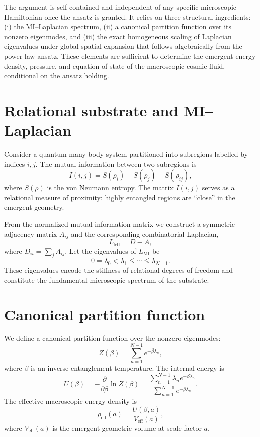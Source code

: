 \documentclass[aps,prd,onecolumn,nofootinbib,preprint]{revtex4-2}
\begin{document}
The argument is self-contained and independent of any specific microscopic Hamiltonian once the
ansatz is granted. It relies on three structural ingredients: (i) the MI--Laplacian spectrum, (ii) a
canonical partition function over its nonzero eigenmodes, and (iii) the exact homogeneous scaling
of Laplacian eigenvalues under global spatial expansion that follows algebraically from the
power-law ansatz. These elements are sufficient to determine the emergent energy density, pressure,
and equation of state of the macroscopic cosmic fluid, conditional on the ansatz holding.

\section{Relational substrate and MI--Laplacian}

Consider a quantum many-body system partitioned into subregions labelled by indices $i,j$. The
mutual information between two subregions is
\begin{equation}
I(i,j) = S(\rho_i) + S(\rho_j) - S(\rho_{ij}),
\end{equation}
where $S(\rho)$ is the von Neumann entropy. The matrix $I(i,j)$ serves as a relational measure of
proximity: highly entangled regions are ``close'' in the emergent geometry.

From the normalized mutual-information matrix we construct a symmetric adjacency matrix
$A_{ij}$ and the corresponding combinatorial Laplacian,
\begin{equation}
L_{\mathrm{MI}} = D - A,
\end{equation}
where $D_{ii} = \sum_j A_{ij}$. Let the eigenvalues of $L_{\mathrm{MI}}$ be
\begin{equation}
0 = \lambda_0 < \lambda_1 \le \cdots \le \lambda_{N-1}.
\end{equation}
These eigenvalues encode the stiffness of relational degrees of freedom and constitute the
fundamental microscopic spectrum of the substrate.

\section{Canonical partition function}

We define a canonical partition function over the nonzero eigenmodes:
\begin{equation}
Z(\beta) = \sum_{n=1}^{N-1} e^{-\beta \lambda_n},
\end{equation}
where $\beta$ is an inverse entanglement temperature. The internal energy is
\begin{equation}
U(\beta)
= -\frac{\partial}{\partial \beta} \ln Z(\beta)
= \frac{\sum_{n=1}^{N-1} \lambda_n e^{-\beta \lambda_n}}
       {\sum_{n=1}^{N-1} e^{-\beta \lambda_n}}.
\end{equation}
The effective macroscopic energy density is
\begin{equation}
\rho_{\mathrm{eff}}(a) = \frac{U(\beta,a)}{V_{\mathrm{eff}}(a)},
\end{equation}
where $V_{\mathrm{eff}}(a)$ is the emergent geometric volume at scale factor $a$.
\end{document}
